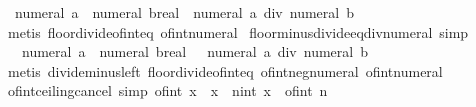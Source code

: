 \begin{isabellebody}
\ \ {\isachardoublequoteopen}{\isasymlfloor}numeral\ a\ {\isacharslash}{\kern0pt}\ numeral\ b{\isacharcolon}{\kern0pt}{\isacharcolon}{\kern0pt}real{\isasymrfloor}\ {\isacharequal}{\kern0pt}\ numeral\ a\ div\ numeral\ b{\isachardoublequoteclose}\isanewline
%
\isadelimproof
%
\endisadelimproof
%
\isatagproof
{}\isamarkupfalse%
\ {\isacharparenleft}{\kern0pt}metis\ floor{\isacharunderscore}{\kern0pt}divide{\isacharunderscore}{\kern0pt}of{\isacharunderscore}{\kern0pt}int{\isacharunderscore}{\kern0pt}eq\ of{\isacharunderscore}{\kern0pt}int{\isacharunderscore}{\kern0pt}numeral{\isacharparenright}{\kern0pt}%
\endisatagproof
{\isafoldproof}%
%
\isadelimproof
\isanewline
%
\endisadelimproof
\isanewline
{}\isamarkupfalse%
\ floor{\isacharunderscore}{\kern0pt}minus{\isacharunderscore}{\kern0pt}divide{\isacharunderscore}{\kern0pt}eq{\isacharunderscore}{\kern0pt}div{\isacharunderscore}{\kern0pt}numeral\ {\isacharbrackleft}{\kern0pt}simp{\isacharbrackright}{\kern0pt}{\isacharcolon}{\kern0pt}\isanewline
\ \ {\isachardoublequoteopen}{\isasymlfloor}{\isacharminus}{\kern0pt}\ {\isacharparenleft}{\kern0pt}numeral\ a\ {\isacharslash}{\kern0pt}\ numeral\ b{\isacharparenright}{\kern0pt}{\isacharcolon}{\kern0pt}{\isacharcolon}{\kern0pt}real{\isasymrfloor}\ {\isacharequal}{\kern0pt}\ {\isacharminus}{\kern0pt}\ numeral\ a\ div\ numeral\ b{\isachardoublequoteclose}\isanewline
%
\isadelimproof
%
\endisadelimproof
%
\isatagproof
{}\isamarkupfalse%
\ {\isacharparenleft}{\kern0pt}metis\ divide{\isacharunderscore}{\kern0pt}minus{\isacharunderscore}{\kern0pt}left\ floor{\isacharunderscore}{\kern0pt}divide{\isacharunderscore}{\kern0pt}of{\isacharunderscore}{\kern0pt}int{\isacharunderscore}{\kern0pt}eq\ of{\isacharunderscore}{\kern0pt}int{\isacharunderscore}{\kern0pt}neg{\isacharunderscore}{\kern0pt}numeral\ of{\isacharunderscore}{\kern0pt}int{\isacharunderscore}{\kern0pt}numeral{\isacharparenright}{\kern0pt}%
\endisatagproof
{\isafoldproof}%
%
\isadelimproof
\isanewline
%
\endisadelimproof
\isanewline
{}\isamarkupfalse%
\ of{\isacharunderscore}{\kern0pt}int{\isacharunderscore}{\kern0pt}ceiling{\isacharunderscore}{\kern0pt}cancel\ {\isacharbrackleft}{\kern0pt}simp{\isacharbrackright}{\kern0pt}{\isacharcolon}{\kern0pt}\ {\isachardoublequoteopen}of{\isacharunderscore}{\kern0pt}int\ {\isasymlceil}x{\isasymrceil}\ {\isacharequal}{\kern0pt}\ x\ {\isasymlongleftrightarrow}\ {\isacharparenleft}{\kern0pt}{\isasymexists}n{\isacharcolon}{\kern0pt}{\isacharcolon}{\kern0pt}int{\isachardot}{\kern0pt}\ x\ {\isacharequal}{\kern0pt}\ of{\isacharunderscore}{\kern0pt}int\ n{\isacharparenright}{\kern0pt}{\isachardoublequoteclose}\isanewline

\end{isabellebody}
